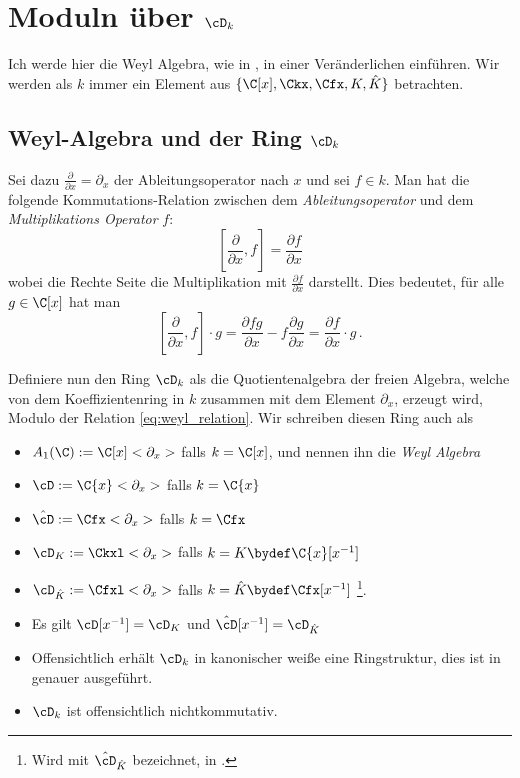 
\chapter{Moduln über $\cD_k$}
Ich werde hier die Weyl Algebra, wie in \cite[Chapter~1]{sabbah_cimpa90}, in
einer Veränderlichen einführen.
Wir werden als $k$ immer ein Element aus $\{ \C[x],\Ckx,\Cfx,K,\hat K \}$
betrachten.

\section{Weyl-Algebra und der Ring $\cD_k$}
Sei dazu $\frac{\partial}{\partial x}=\partial_x$ der Ableitungsoperator nach
$x$ und sei $f \in k$.
Man hat die folgende
Kommutations-Relation zwischen dem \emph{Ableitungsoperator} und dem
\emph{Multiplikations Operator} $f$:
\begin{equation}\label{eq:weyl_relation}
[\frac{\partial}{\partial x},f]=\frac{\partial f}{\partial x}
\end{equation}
wobei die Rechte Seite die Multiplikation mit $\frac{\partial f}{\partial x}$
darstellt. Dies bedeutet, für alle $g\in\C[x]$ hat man
\[
[\frac{\partial}{\partial x},f]\cdot g
=\frac{\partial fg}{\partial x} - f\frac{\partial g}{\partial x}
=\frac{\partial f}{\partial x} \cdot g \,.
\]
\begin{defn}
Definiere nun den Ring $\cD_k$ als die Quotientenalgebra der freien Algebra,
welche von dem Koeffizientenring in $k$ zusammen mit dem Element $\partial_x$,
erzeugt wird, Modulo der Relation \eqref{eq:weyl_relation}.  Wir schreiben
diesen Ring auch als
\begin{itemize}
\item $A_1(\C):=\C[x]<\partial_x>$ falls $k=\C[x]$, und nennen ihn die
\emph{Weyl Algebra}
\item $\cD:=\C\{x\}<\partial_x>$ falls $k=\C\{x\}$
\item $\hat\cD:=\Cfx<\partial_x>$ falls $k=\Cfx$
\item $\cD_K:=\Ckxl<\partial_x>$ falls
$k=K\bydef\C\{x\}[x^{-1}]$
\item $\cD_{\hat K}:=\Cfxl<\partial_x>$ falls $k=\hat
K\bydef\Cfx[x^{-1}]$
\footnote{Wird mit $\hat\cD_{\hat K}$ bezeichnet, in \cite{ZulaBarbara}.}.
\end{itemize}
\end{defn}
\begin{bem}
\begin{itemize}
\item Es gilt $\cD[x^{-1}]=\cD_K$ und $\hat \cD[x^{-1}]=\cD_{\hat
K}$
\item Offensichtlich erhält $\cD_k$ in kanonischer weiße eine Ringstruktur,
dies ist in \cite[Kapittel 2 Section 1]{ZulaBarbara} genauer ausgeführt.
\item $\cD_k$ ist offensichtlich nichtkommutativ.
\end{itemize}
\end{bem}


